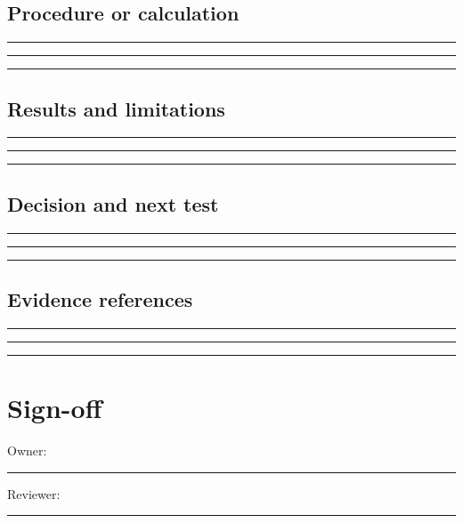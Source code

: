 \documentclass[11pt]{article}
\begin{document}
\subsection{Procedure or calculation}
\noindent\rule{\linewidth}{0.35pt}\par\vspace{0.22in}
\noindent\rule{\linewidth}{0.35pt}\par\vspace{0.22in}
\noindent\rule{\linewidth}{0.35pt}\par\vspace{0.18in}

\subsection{Results and limitations}
\noindent\rule{\linewidth}{0.35pt}\par\vspace{0.22in}
\noindent\rule{\linewidth}{0.35pt}\par\vspace{0.22in}
\noindent\rule{\linewidth}{0.35pt}\par\vspace{0.18in}

\subsection{Decision and next test}
\noindent\rule{\linewidth}{0.35pt}\par\vspace{0.22in}
\noindent\rule{\linewidth}{0.35pt}\par\vspace{0.22in}
\noindent\rule{\linewidth}{0.35pt}\par\vspace{0.18in}

\subsection{Evidence references}
\noindent\rule{\linewidth}{0.35pt}\par\vspace{0.22in}
\noindent\rule{\linewidth}{0.35pt}\par\vspace{0.22in}
\noindent\rule{\linewidth}{0.35pt}\par\vspace{0.18in}

\section{Sign-off}
Owner: \rule{0.38\linewidth}{0.4pt}\hfill Reviewer: \rule{0.38\linewidth}{0.4pt}\par
\end{document}
